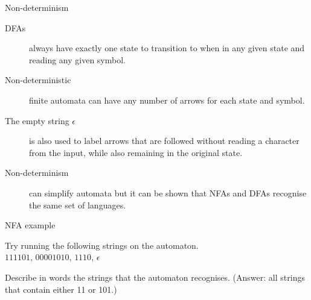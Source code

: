 \begin{frame}{Non-determinism}
  \begin{description}
    \item[DFAs] always have exactly one state to transition to when in any given state and reading any given symbol.
    \vspace{4mm}
    \item[Non-deterministic] finite automata can have any number of arrows for each state and symbol.
    \vspace{4mm}
    \item[The empty string \( \epsilon \)] is also used to label arrows that are followed without reading a character from the input, while also remaining in the original state.
    \vspace{4mm} 
    \item[Non-determinism] can simplify automata but it can be shown that NFAs and DFAs recognise the same set of languages.
  \end{description}
\end{frame}


\begin{frame}[fragile]{NFA example}
  \begin{center}
  \end{center}
  \begin{center}
    Try running the following strings on the automaton. \\
    \( 111101 \), \( 00001010 \), \( 1110 \), \( \epsilon \) \\
    \pause
    
    \vspace{2mm}
    Describe in words the strings that the automaton recognises.
    \pause
    \vspace{1mm}
    (Answer: all strings that contain either 11 or 101.)
  \end{center}
\end{frame}

